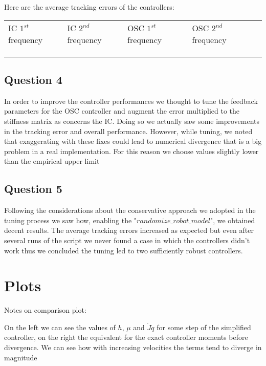 \documentclass[10pt]{article}
\begin{document}
Here are the average tracking errors of the controllers:

\begin{table}[h]
    \begin{tabular}{lllll}
    \cline{1-4}
    \multicolumn{1}{|l|}{IC $1^{st}$ frequency} & \multicolumn{1}{l|}{IC $2^{nd}$ frequency} & \multicolumn{1}{l|}{OSC $1^{st}$ frequency} & \multicolumn{1}{l|}{OSC $2^{nd}$ frequency} &  \\ \cline{1-4}
    \multicolumn{1}{|l|}{} & \multicolumn{1}{l|}{} & \multicolumn{1}{l|}{} & \multicolumn{1}{l|}{} &  \\ \cline{1-4}
                           &                       &                       &                       &  \\
                           &                       &                       &                       & 
    \end{tabular}
\end{table}

\subsection{Question 4}

In order to improve the controller performances we thought to tune the feedback parameters for the OSC controller and augment the error multiplied to the stiffness matrix as concerns the IC. Doing so we actually saw some improvements in the tracking error and overall performance. However, while tuning, we noted that exaggerating with these fixes could lead to numerical divergence that is a big problem in a real implementation. For this reason we choose values slightly lower than the empirical upper limit

\subsection{Question 5}

Following the considerations about the conservative approach we adopted in the tuning process we saw how, enabling the "$randomize\_robot\_model$", we obtained decent results. The average tracking errors increased as expected but even after several runs of the script we never found a case in which the controllers didn't work thus we concluded the tuning led to two sufficiently robust controllers.

\pagebreak

\section{Plots}

Notes on comparison plot:

On the left we can see the values of $h$, $\mu$ and $\dot J \dot q$ for some step of the simplified controller, on the right the equivalent for the exact controller moments before divergence. We can see how with increasing velocities the terms tend to diverge in magnitude
\end{document}
